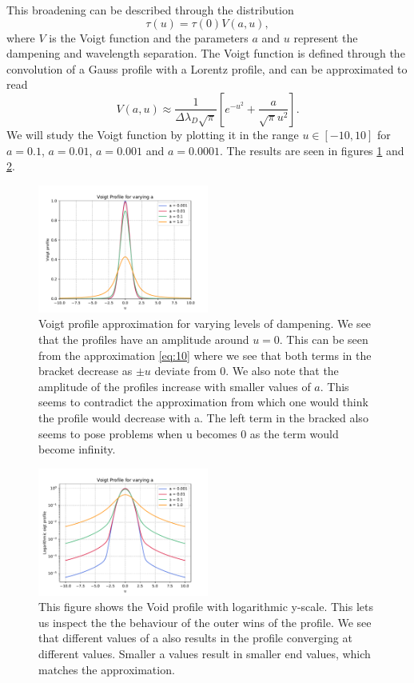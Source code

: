 \documentclass[a4paper,11.5pt,]{article}
\begin{document}
\begin{multicols}{2}
 \noindent This broadening can be described through the distribution 
\begin{equation}
    \tau(u) = \tau(0) V(a,u),
\end{equation}
where $V$ is the Voigt function and the parameters $a$ and $u$ represent the dampening and wavelength separation. The Voigt function is defined through the convolution of a Gauss profile with a Lorentz profile, and can be approximated to read
\begin{equation}\label{eq:10}
    V(a,u) \approx \frac{1}{\Delta \lambda_D \sqrt{\pi}} \left[ e^{-u^2} + \frac{a}{\sqrt{\pi}u^2} \right].
\end{equation}
We will study the Voigt function by plotting it in the range $u \in [-10,10]$ for $a=0.1$, $a = 0.01$, $a = 0.001$ and $a = 0.0001$. The results are seen in figures \ref{fig:19} and \ref{fig:20}.

\begin{figure}[H]
	\centering
	\includegraphics[width=0.5\textwidth]{SSA/figures/voigt.pdf}
	\caption{Voigt profile approximation for varying levels of dampening. We see that the profiles have an amplitude around $u=0$. This can be seen from the approximation \eqref{eq:10} where we see that both terms in the bracket decrease as $\pm u$ deviate from 0. We also note that the amplitude of the profiles increase with smaller values of $a$. This seems to contradict the approximation from which one would think the profile would decrease with a. The left term in the bracked also seems to pose problems when u becomes 0 as the term would become infinity.}
	\label{fig:19}
\end{figure}

\begin{figure}[H]
	\centering
	\includegraphics[width=0.5\textwidth]{SSA/figures/voigtlog.pdf}
	\caption{This figure shows the Void profile with logarithmic y-scale. This lets us inspect the the behaviour of the outer wins of the profile. We see that different values of a also results in the profile converging at different values. Smaller a values result in smaller end values, which matches the approximation. }
	\label{fig:20}
\end{figure}


\end{multicols}
\end{document}
